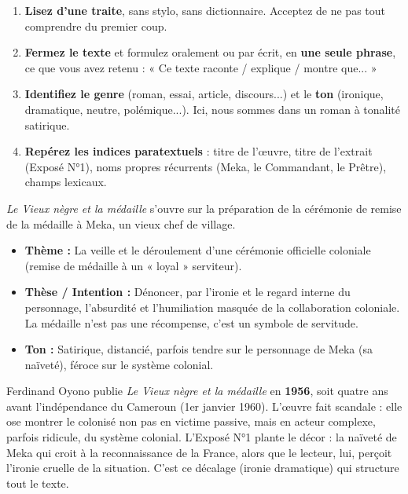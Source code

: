 \documentclass[11pt]{article}
\begin{document}
\begin{methode}
\begin{enumerate}
\item \textbf{Lisez d'une traite}, sans stylo, sans dictionnaire. Acceptez de ne pas tout comprendre du premier coup.
\item \textbf{Fermez le texte} et formulez oralement ou par écrit, en \textbf{une seule phrase}, ce que vous avez retenu : « Ce texte raconte / explique / montre que... »
\item \textbf{Identifiez le genre} (roman, essai, article, discours...) et le \textbf{ton} (ironique, dramatique, neutre, polémique...). Ici, nous sommes dans un roman à tonalité satirique.
\item \textbf{Repérez les indices paratextuels} : titre de l'œuvre, titre de l'extrait (Exposé N°1), noms propres récurrents (Meka, le Commandant, le Prêtre), champs lexicaux.
\end{enumerate}
\end{methode}

\begin{exemplebox}
\emph{Le Vieux nègre et la médaille} s'ouvre sur la préparation de la cérémonie de remise de la médaille à Meka, un vieux chef de village.
\begin{itemize}
\item \textbf{Thème :} La veille et le déroulement d'une cérémonie officielle coloniale (remise de médaille à un « loyal » serviteur).
\item \textbf{Thèse / Intention :} Dénoncer, par l'ironie et le regard interne du personnage, l'absurdité et l'humiliation masquée de la collaboration coloniale. La médaille n'est pas une récompense, c'est un symbole de servitude.
\item \textbf{Ton :} Satirique, distancié, parfois tendre sur le personnage de Meka (sa naïveté), féroce sur le système colonial.
\end{itemize}
\end{exemplebox}

\begin{savaistu}
Ferdinand Oyono publie \emph{Le Vieux nègre et la médaille} en \textbf{1956}, soit quatre ans avant l'indépendance du Cameroun (1er janvier 1960). L'œuvre fait scandale : elle ose montrer le colonisé non pas en victime passive, mais en acteur complexe, parfois ridicule, du système colonial. L'Exposé N°1 plante le décor : la naïveté de Meka qui croit à la reconnaissance de la France, alors que le lecteur, lui, perçoit l'ironie cruelle de la situation. C'est ce décalage (ironie dramatique) qui structure tout le texte.
\end{savaistu}
\end{document}
